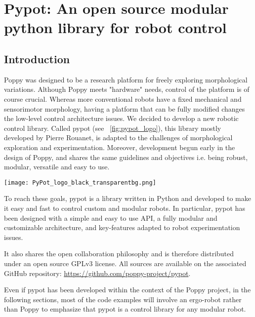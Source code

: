 
\cleartoleftpage

\chapter{Pypot: An open source modular python library for robot control} %

\section{Introduction} %

Poppy was designed to be a research platform for freely exploring morphological variations. Although Poppy meets "hardware" needs, control of the platform is of course crucial. Whereas more conventional robots have a fixed mechanical and sensorimotor morphology, having a platform that can be fully modified changes the low-level control architecture issues.
We decided to develop a new robotic control library. Called pypot (see \figurename~\ref{fig:pypot_logo}), this library mostly developed by Pierre Rouanet, is adapted to the challenges of morphological exploration and experimentation. Moreover, development begun early in the design of Poppy, and shares the same guidelines and objectives i.e. being robust, modular, versatile and easy to use.


\begin{NFfigure}
    \centering
        \texttt{[image: PyPot\_logo\_black\_transparentbg.png]}
    \caption{}
    \label{fig:pypot_logo}
\end{NFfigure}

To reach these goals, pypot is a library written in Python and developed to make it easy and fast to control custom and modular robots. In particular, pypot has been designed with a simple and easy to use API, a fully modular and customizable architecture, and key-features adapted to robot experimentation issues.

It also shares the open collaboration philosophy and is therefore distributed under an open source GPLv3 license. All sources are available on the associated GitHub repository: \url{https://github.com/poppy-project/pypot}.

Even if pypot has been developed within the context of the Poppy project, in the following sections, most of the code examples will involve an ergo-robot rather than Poppy to emphasize that pypot is a control library for any modular robot.



